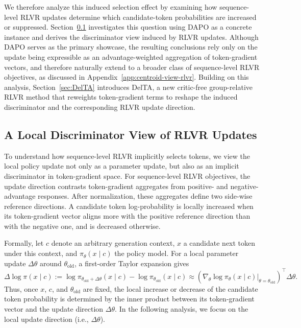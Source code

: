\documentclass{llmxive}
\begin{document}
We therefore analyze this induced selection effect by examining how sequence-level RLVR updates determine which candidate-token probabilities are increased or suppressed. Section~\ref{sec:motive} investigates this question using DAPO as a concrete instance and derives the discriminator view induced by RLVR updates. Although DAPO serves as the primary showcase, the resulting conclusions rely only on the update being expressible as an advantage-weighted aggregation of token-gradient vectors, and therefore naturally extend to a broader class of sequence-level RLVR objectives, as discussed in Appendix~\ref{app:centroid-view-rlvr}. Building on this analysis, Section~\ref{sec:DelTA} introduces DelTA, a new critic-free group-relative RLVR method that reweights token-gradient terms to reshape the induced discriminator and the corresponding RLVR update direction.



\subsection{A Local Discriminator View of RLVR Updates}
\label{sec:motive}

To understand how sequence-level RLVR implicitly selects tokens, we view the local policy update not only as a parameter update, but also as an implicit discriminator in token-gradient space.
For sequence-level RLVR objectives, the update direction contrasts token-gradient aggregates from positive- and negative-advantage responses.
After normalization, these aggregates define two side-wise reference directions.
A candidate token log-probability is locally increased when its token-gradient vector aligns more with the positive reference direction than with the negative one, and is decreased otherwise.

Formally, let \(c\) denote an arbitrary generation context, \(x\) a candidate next token under this context, and \(\pi_\theta(x\mid c)\) the policy model. 
For a local parameter update \(\Delta\theta\) around \(\theta_{\mathrm{old}}\), a first-order Taylor expansion gives
\begin{equation}
\label{eq:local-logprob-change}
\Delta \log \pi(x\mid c)
:=
\log \pi_{\theta_{\mathrm{old}}+\Delta\theta}(x\mid c)
-
\log \pi_{\theta_{\mathrm{old}}}(x\mid c)
\approx
\left(
\nabla_\theta \log \pi_\theta(x\mid c)
\Big|_{\theta=\theta_{\mathrm{old}}}
\right)^{\top}
\Delta\theta .
\end{equation}
Thus, once \(x\), \(c\), and \(\theta_{\mathrm{old}}\) are fixed, the local increase or decrease of the candidate token probability is determined by the inner product between its token-gradient vector and the update direction \(\Delta\theta\). In the following analysis, we focus on the local update direction (i.e., \(\Delta\theta\)).
\end{document}
